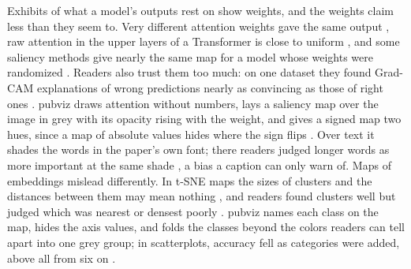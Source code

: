 \documentclass[11pt]{article}
\begin{document}
Exhibits of what a model's outputs rest on show weights, and the weights
claim less than they seem to. Very different attention weights gave the same
output \citep[Sec.~4.2]{jain2019attention}, raw attention in the upper layers of
a Transformer is close to uniform \citep[Sec.~2]{abnar2020quantifying}, and some
saliency methods give nearly the same map for a model whose weights were
randomized \citep[Sec.~3]{adebayo2018sanity}. Readers also trust them too much:
on one dataset they found Grad-CAM explanations of wrong predictions nearly
as convincing as those of right ones \citep[Table~1]{kim2022hive}. pubviz draws
attention without numbers, lays a saliency map over the image in grey with
its opacity rising with the weight, and gives a signed map two hues, since a
map of absolute values hides where the sign flips
\citep[Fig.~4]{adebayo2018sanity}. Over text it shades the words in the
paper's own font; there readers judged longer words as more important at the
same shade \citep[Sec.~5.1]{schuff2022human}, a bias a caption can only warn
of. Maps of embeddings mislead differently. In t-SNE maps the sizes of
clusters and the distances between them may mean nothing
\citep[Secs.~2--3]{wattenberg2016tsne}, and readers found clusters well but
judged which was nearest or densest poorly
\citep[Sec.~6.3.1]{xia2022revisiting}. pubviz names each class on the map,
hides the axis values, and folds the classes beyond the colors readers can
tell apart into one grey group; in scatterplots, accuracy fell as categories
were added, above all from six on \citep[Secs.~4.1, 5.2]{tseng2023categorical}.
\end{document}
